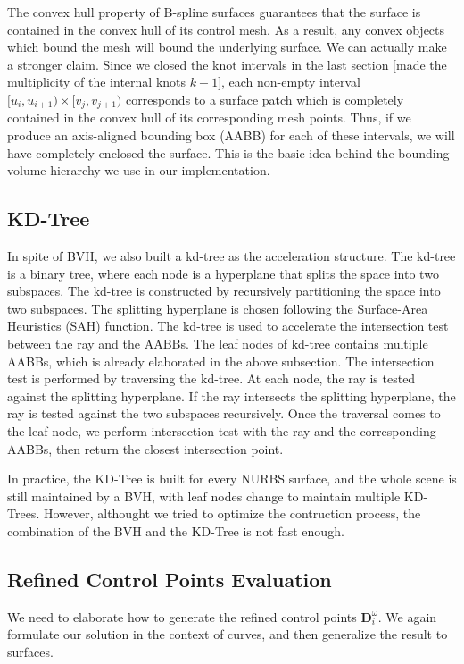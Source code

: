 \documentclass[acmtog]{acmart}
\begin{document}
The convex hull property of B-spline surfaces guarantees that the surface is contained in the convex hull of its control mesh. As a result, any convex objects which bound the mesh will bound the underlying surface. We can actually make a stronger claim. Since we closed the knot intervals in the last section [made the multiplicity of the internal knots $k-1$], each non-empty interval $[u_i,u_{i+1})\times[v_j,v_{j+1})$ corresponds to a surface patch which is completely contained in the convex hull of its corresponding mesh points. Thus, if we produce an axis-aligned bounding box (AABB) for each of these intervals, we will have completely enclosed the surface. This is the basic idea behind the bounding volume hierarchy we use in our implementation.

\subsection{KD-Tree}
\hspace*{8pt}
In spite of BVH, we also built a kd-tree as the acceleration structure. The kd-tree is a binary tree, where each node is a hyperplane that splits the space into two subspaces. The kd-tree is constructed by recursively partitioning the space into two subspaces. The splitting hyperplane is chosen following the Surface-Area Heuristics (SAH) function. The kd-tree is used to accelerate the intersection test between the ray and the AABBs. The leaf nodes of kd-tree contains multiple AABBs, which is already elaborated in the above subsection. The intersection test is performed by traversing the kd-tree. At each node, the ray is tested against the splitting hyperplane. If the ray intersects the splitting hyperplane, the ray is tested against the two subspaces recursively. Once the traversal comes to the leaf node, we perform intersection test with the ray and the corresponding AABBs, then return the closest intersection point.

In practice, the KD-Tree is built for every NURBS surface, and the whole scene is still maintained by a BVH, with leaf nodes change to maintain multiple KD-Trees. However, althought we tried to optimize the contruction process, the combination of the BVH and the KD-Tree is not fast enough.

\subsection{Refined Control Points Evaluation}
\hspace*{8pt}
We need to elaborate how to generate the refined control points $\mathbf{D}_i^{\omega}$. We again formulate our solution in the context of curves, and then generalize the result to surfaces.
\end{document}
